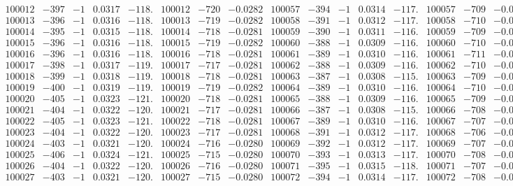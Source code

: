 \documentclass[11pt,reqno,a4letter]{article}
\numberwithin{figure}{section}
\numberwithin{table}{section}
\theoremstyle{plain}
\numberwithin{theorem}{section}
\theoremstyle{definition}
\begin{document}
\begin{table}[ht!]
\begin{equation*}
{\begin{array}{ccccc|ccc||ccccc|ccc}
100012 & -397 & -1 & 0.0317 & -118. & 100012 & -720 & -0.0282 & 100057 & -394 & -1 & 0.0314 & -117. & 100057 & -709 & -0.0278  \\
100013 & -396 & -1 & 0.0316 & -118. & 100013 & -719 & -0.0282 & 100058 & -391 & -1 & 0.0312 & -117. & 100058 & -710 & -0.0278  \\
100014 & -395 & -1 & 0.0315 & -118. & 100014 & -718 & -0.0281 & 100059 & -390 & -1 & 0.0311 & -116. & 100059 & -709 & -0.0278  \\
100015 & -396 & -1 & 0.0316 & -118. & 100015 & -719 & -0.0282 & 100060 & -388 & -1 & 0.0309 & -116. & 100060 & -710 & -0.0278  \\
100016 & -396 & -1 & 0.0316 & -118. & 100016 & -718 & -0.0281 & 100061 & -389 & -1 & 0.0310 & -116. & 100061 & -711 & -0.0278  \\
100017 & -398 & -1 & 0.0317 & -119. & 100017 & -717 & -0.0281 & 100062 & -388 & -1 & 0.0309 & -116. & 100062 & -710 & -0.0278  \\
100018 & -399 & -1 & 0.0318 & -119. & 100018 & -718 & -0.0281 & 100063 & -387 & -1 & 0.0308 & -115. & 100063 & -709 & -0.0278  \\
100019 & -400 & -1 & 0.0319 & -119. & 100019 & -719 & -0.0282 & 100064 & -389 & -1 & 0.0310 & -116. & 100064 & -710 & -0.0278  \\
100020 & -405 & -1 & 0.0323 & -121. & 100020 & -718 & -0.0281 & 100065 & -388 & -1 & 0.0309 & -116. & 100065 & -709 & -0.0278  \\
100021 & -404 & -1 & 0.0322 & -120. & 100021 & -717 & -0.0281 & 100066 & -387 & -1 & 0.0308 & -115. & 100066 & -708 & -0.0277  \\
100022 & -405 & -1 & 0.0323 & -121. & 100022 & -718 & -0.0281 & 100067 & -389 & -1 & 0.0310 & -116. & 100067 & -707 & -0.0277  \\
100023 & -404 & -1 & 0.0322 & -120. & 100023 & -717 & -0.0281 & 100068 & -391 & -1 & 0.0312 & -117. & 100068 & -706 & -0.0276  \\
100024 & -403 & -1 & 0.0321 & -120. & 100024 & -716 & -0.0280 & 100069 & -392 & -1 & 0.0312 & -117. & 100069 & -707 & -0.0277  \\
100025 & -406 & -1 & 0.0324 & -121. & 100025 & -715 & -0.0280 & 100070 & -393 & -1 & 0.0313 & -117. & 100070 & -708 & -0.0277  \\
100026 & -404 & -1 & 0.0322 & -120. & 100026 & -716 & -0.0280 & 100071 & -395 & -1 & 0.0315 & -118. & 100071 & -707 & -0.0277  \\
100027 & -403 & -1 & 0.0321 & -120. & 100027 & -715 & -0.0280 & 100072 & -394 & -1 & 0.0314 & -117. & 100072 & -708 & -0.0277  \\

\end{array}}
\end{equation*}
\end{table}
\end{document}
